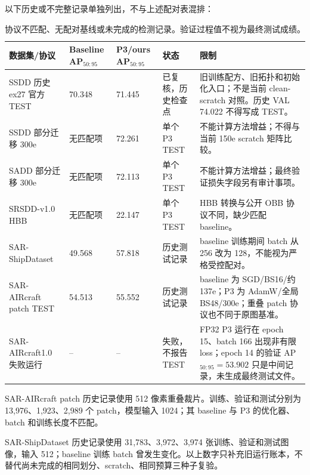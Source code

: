 \documentclass[UTF8,12pt,a4paper]{ctexart}
\begin{document}
以下历史或不完整记录单独列出，不与上述配对表混排：
\begin{table}[H]\centering\scriptsize
\caption{协议不匹配、无配对基线或未完成的检测记录。验证过程值不视为最终测试成绩。}
\begin{tabularx}{\linewidth}{p{2.3cm}p{2.1cm}p{2.6cm}p{2.7cm}X}
\toprule
数据集/协议 & Baseline AP$_{50:95}$ & P3/ours AP$_{50:95}$ & 状态 & 限制\\
\midrule
SSDD 历史 ex27 官方 TEST & 70.348 & 71.445 & 已复核，历史检查点 & 旧训练配方、旧拓扑和初始化入口；不是当前 clean-scratch 对照。历史 VAL 74.022 不得写成 TEST。\\
SSDD 部分迁移 300e & 无匹配项 & 72.261 & 单个 P3 TEST & 不能计算方法增益；不得与当前 150e scratch 矩阵比较。\\
SADD 部分迁移 300e & 无匹配项 & 72.113 & 单个 P3 TEST & 不能计算方法增益；最终验证损失字段另有审计事项。\\
SRSDD-v1.0 HBB & 无匹配项 & 22.147 & 单个 P3 TEST & HBB 转换与公开 OBB 协议不同，缺少匹配 baseline。\\
SAR-ShipDataset & 49.568 & 57.818 & 历史测试记录 & baseline 训练期间 batch 从 256 改为 128，不能视为严格受控配对。\\
SAR-AIRcraft patch TEST & 54.513 & 55.552 & 历史测试记录 & baseline 为 SGD/BS16/约 137e；P3 为 AdamW/全局 BS48/300e；重叠 patch 协议也不同于原图基准。\\
SAR-AIRcraft1.0 失败运行 & -- & -- & 失败，不报告 TEST & FP32 P3 运行在 epoch 15、batch 166 出现非有限 loss；epoch 14 的验证 AP$_{50:95}=53.902$ 只是中间记录，未生成最终测试文件。\\
\bottomrule
\end{tabularx}
\end{table}

SAR-AIRcraft patch 历史记录使用 512 像素重叠裁片。训练、验证和测试分别为 13,976、1,923、2,989 个 patch，模型输入 1024；其 baseline 与 P3 的优化器、batch 和训练长度不匹配。

SAR-ShipDataset 历史记录使用 31,783、3,972、3,974 张训练、验证和测试图像，输入 512；baseline 训练 batch 曾发生变化。以上数字只补充旧运行账本，不替代尚未完成的相同划分、scratch、相同预算三种子复验。
\end{document}
